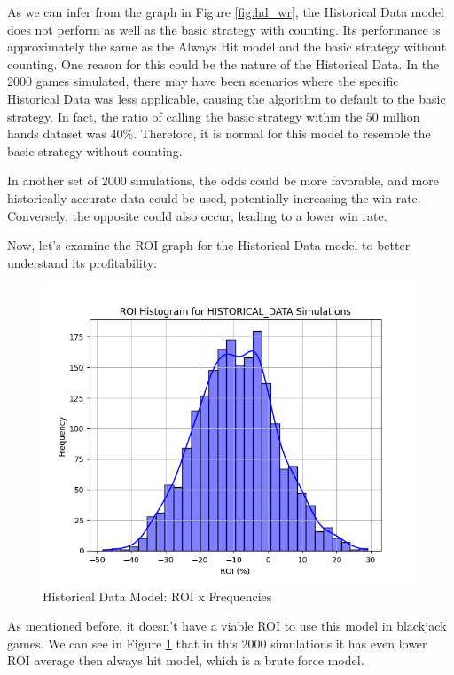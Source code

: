 \documentclass[a4paper,12pt]{report}
\begin{document}
As we can infer from the graph in Figure \ref{fig:hd_wr}, the Historical Data model does not perform as well as the basic strategy with counting. Its performance is approximately the same as the Always Hit model and the basic strategy without counting. One reason for this could be the nature of the Historical Data. In the 2000 games simulated, there may have been scenarios where the specific Historical Data was less applicable, causing the algorithm to default to the basic strategy. In fact, the ratio of calling the basic strategy within the 50 million hands dataset was 40\%. Therefore, it is normal for this model to resemble the basic strategy without counting.

In another set of 2000 simulations, the odds could be more favorable, and more historically accurate data could be used, potentially increasing the win rate. Conversely, the opposite could also occur, leading to a lower win rate.

Now, let's examine the ROI graph for the Historical Data model to better understand its profitability:

\begin{figure}[h]
\begin{center}
\includegraphics[scale=0.5]{figures/graphs/hd_roi.png}
\end{center}
\caption{Historical Data Model: ROI x Frequencies}
\label{fig:hd_roi}
\end{figure}

As mentioned before, it doesn't have a viable ROI to use this model in blackjack games. We can see in Figure \ref{fig:hd_roi} that in this 2000 simulations it has even lower ROI average then always hit model, which is a brute force model.
\end{document}
